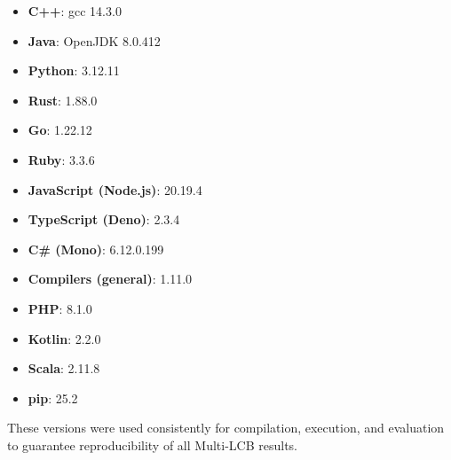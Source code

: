 \documentclass{article} %
\begin{document}
\begin{itemize}
    \item \textbf{C++}: gcc 14.3.0
    \item \textbf{Java}: OpenJDK 8.0.412
    \item \textbf{Python}: 3.12.11
    \item \textbf{Rust}: 1.88.0
    \item \textbf{Go}: 1.22.12
    \item \textbf{Ruby}: 3.3.6
    \item \textbf{JavaScript (Node.js)}: 20.19.4
    \item \textbf{TypeScript (Deno)}: 2.3.4
    \item \textbf{C\# (Mono)}: 6.12.0.199
    \item \textbf{Compilers (general)}: 1.11.0
    \item \textbf{PHP}: 8.1.0
    \item \textbf{Kotlin}: 2.2.0
    \item \textbf{Scala}: 2.11.8
    \item \textbf{pip}: 25.2
\end{itemize}

These versions were used consistently for compilation, execution, and evaluation to guarantee reproducibility of all Multi-LCB results.

\clearpage










\end{document}
